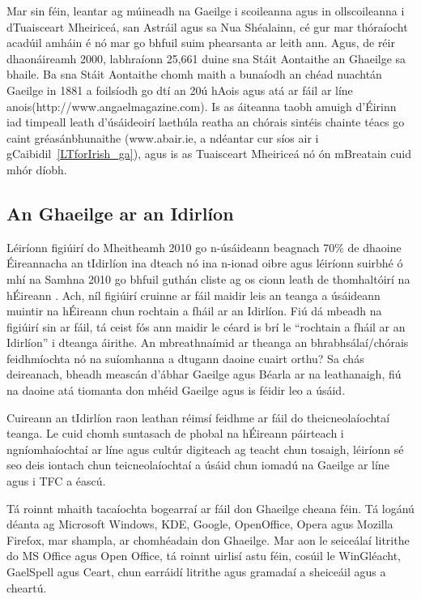 \begin{multicols}{2}
Mar sin féin, leantar ag múineadh na Gaeilge i scoileanna agus in ollscoileanna i dTuaisceart Mheiriceá, san Astráil agus sa Nua Shéalainn, cé gur mar thóraíocht acadúil amháin é nó mar go bhfuil suim phearsanta ar leith ann. Agus, de réir dhaonáireamh 2000, labhraíonn 25,661 duine sna Stáit Aontaithe an Ghaeilge sa bhaile. Ba sna Stáit Aontaithe chomh maith a bunaíodh an chéad nuachtán Gaeilge in 1881 a foilsíodh go dtí an 20ú hAois agus atá ar fáil ar líne anois(http://www.angaelmagazine.com).  Is as áiteanna taobh amuigh d’Éirinn iad timpeall leath d’úsáideoirí laethúla reatha an chórais sintéis chainte téacs go caint gréasánbhunaithe (www.abair.ie, a ndéantar cur síos air i gCaibidil~\ref{LTforIrish_ga}), agus is as Tuaisceart Mheiriceá nó ón mBreatain cuid mhór díobh.


\subsection{An Ghaeilge ar an Idirlíon}

Léiríonn figiúirí do Mheitheamh 2010 go n-úsáideann beagnach 70\% de dhaoine Éireannacha an tIdirlíon ina dteach nó ina n-ionad oibre \cite{internetstats}agus léiríonn suirbhé ó mhí na Samhna 2010 go bhfuil guthán cliste ag os cionn leath de thomhaltóirí na hÉireann \cite{mindshare}. Ach, níl figiúirí cruinne ar fáil maidir leis an teanga a úsáideann muintir na hÉireann chun rochtain a fháil ar an Idirlíon. Fiú dá mbeadh na figiúirí sin ar fáil, tá ceist fós ann maidir le céard is brí le “rochtain a fháil ar an Idirlíon” i dteanga áirithe. An mbreathnaímid ar theanga an bhrabhsálaí/chórais feidhmíochta nó na suíomhanna a dtugann daoine cuairt orthu? Sa chás deireanach, bheadh meascán d’ábhar Gaeilge agus Béarla ar na leathanaigh, fiú na daoine atá tiomanta don mhéid Gaeilge agus is féidir leo a úsáid.

Cuireann an tIdirlíon raon leathan réimsí feidhme ar fáil do theicneolaíochtaí teanga. Le cuid chomh suntasach de phobal na hÉireann páirteach i ngníomhaíochtaí ar líne agus cultúr digiteach ag teacht chun tosaigh, léiríonn sé seo deis iontach chun teicneolaíochtaí a úsáid chun iomadú na Gaeilge ar líne agus i TFC a éascú.

Tá roinnt mhaith tacaíochta bogearraí ar fáil don Ghaeilge cheana féin.  Tá logánú déanta ag Microsoft Windows, KDE, Google, OpenOffice, Opera agus Mozilla Firefox, mar shampla, ar chomhéadain don Ghaeilge. Mar aon le seiceálaí litrithe do MS Office agus Open Office, tá roinnt uirlisí astu féin, cosúil le WinGléacht, GaelSpell agus Ceart, chun earráidí litrithe agus gramadaí a sheiceáil agus a cheartú. 


\end{multicols}
